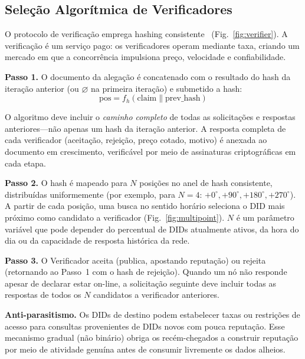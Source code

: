 \documentclass[11pt,a4paper,twocolumn]{article}
\begin{document}
\subsection{Seleção Algorítmica de Verificadores}

O protocolo de verificação emprega hashing consistente~\cite{karger1997} (Fig.~\ref{fig:verifier}). A verificação é um serviço pago: os verificadores operam mediante taxa, criando um mercado em que a concorrência impulsiona preço, velocidade e confiabilidade.

\textbf{Passo 1.} O documento da alegação é concatenado com o resultado do hash da iteração anterior (ou $\varnothing$ na primeira iteração) e submetido a hash:
\begin{equation}
\text{pos} = f_h(\text{claim} \| \text{prev\_hash})
\label{eq:hash}
\end{equation}

O algoritmo deve incluir o \emph{caminho completo} de todas as solicitações e respostas anteriores---não apenas um hash da iteração anterior. A resposta completa de cada verificador (aceitação, rejeição, preço cotado, motivo) é anexada ao documento em crescimento, verificável por meio de assinaturas criptográficas em cada etapa.

\textbf{Passo 2.} O hash é mapeado para $N$ posições no anel de hash consistente, distribuídas uniformemente (por exemplo, para $N=4$: $+0^{\circ}, +90^{\circ}, +180^{\circ}, +270^{\circ}$). A partir de cada posição, uma busca no sentido horário seleciona o DID mais próximo como candidato a verificador (Fig.~\ref{fig:multipoint}). $N$ é um parâmetro variável que pode depender do percentual de DIDs atualmente ativos, da hora do dia ou da capacidade de resposta histórica da rede.

\textbf{Passo 3.} O Verificador aceita (publica, apostando reputação) ou rejeita (retornando ao Passo~1 com o hash de rejeição). Quando um nó não responde apesar de declarar estar on-line, a solicitação seguinte deve incluir todas as respostas de todos os $N$ candidatos a verificador anteriores.

\textbf{Anti-parasitismo.} Os DIDs de destino podem estabelecer taxas ou restrições de acesso para consultas provenientes de DIDs novos com pouca reputação. Esse mecanismo gradual (não binário) obriga os recém-chegados a construir reputação por meio de atividade genuína antes de consumir livremente os dados alheios.
\end{document}
